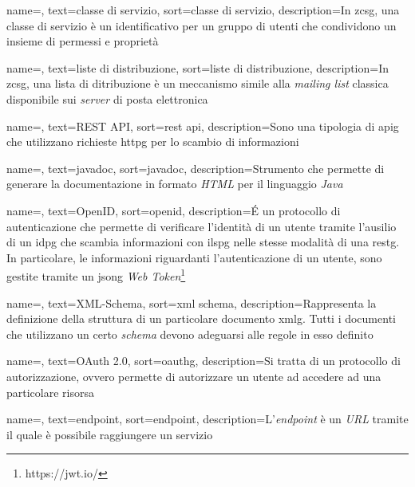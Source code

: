 {
    name=,
    text=classe di servizio,
    sort=classe di servizio,
    description={In \gls{zcsg}, una classe di servizio è un identificativo per un gruppo di utenti che condividono un insieme di permessi e proprietà}
}

{
    name=,
    text=liste di distribuzione,
    sort=liste di distribuzione,
    description={In \gls{zcsg}, una lista di ditribuzione è un meccanismo simile alla \textit{mailing list} classica disponibile sui \textit{server} di posta elettronica}
}

{
    name=,
    text=REST API,
    sort=rest api,
    description={Sono una tipologia di \gls{apig} che utilizzano richieste \gls{httpg} per lo scambio di informazioni}
}

{
    name=,
    text=javadoc,
    sort=javadoc,
    description={Strumento che permette di generare la documentazione in formato \textit{HTML} per il linguaggio \textit{Java}}
}

{
    name=,
    text=OpenID,
    sort=openid,
    description={\'E un protocollo di autenticazione che permette di verificare l'identità di un utente tramite l'ausilio di un \gls{idpg} che scambia informazioni con il\gls{spg} nelle stesse modalità di una \gls{restg}. In particolare, le informazioni riguardanti l'autenticazione di un utente, sono gestite tramite un \gls{jsong} \textit{Web Token}\footnote{https://jwt.io/}}
}

{
    name=,
    text=XML-Schema,
    sort=xml schema,
    description={Rappresenta la definizione della struttura di un particolare documento \gls{xmlg}. Tutti i documenti che utilizzano un certo \textit{schema} devono adeguarsi alle regole in esso definito}
}

{
    name=,
    text=OAuth 2.0,
    sort=oauthg,
    description={Si tratta di un protocollo di autorizzazione, ovvero permette di autorizzare un utente ad accedere ad una particolare risorsa}
}

{
    name=,
    text=endpoint,
    sort=endpoint,
    description={L'\textit{endpoint} è un \textit{URL} tramite il quale è possibile raggiungere un servizio}
}

